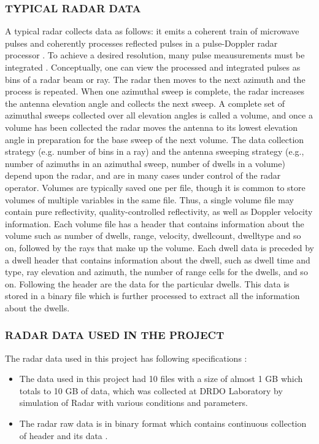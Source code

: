 \documentclass[12pt]{article} %
\begin{document}
\subsubsection{TYPICAL RADAR DATA}
A typical radar collects data as follows: it emits a coherent train of microwave pulses and coherently processes reflected pulses in a pulse-Doppler radar processor . To achieve a desired resolution, many pulse meausurements must be integrated . Conceptually, one can view the processed and integrated pulses as bins of a radar beam or ray. The radar then moves to the next azimuth and the process is repeated. When one azimuthal sweep is complete, the radar increases the antenna elevation angle and collects the next sweep. A complete set of azimuthal sweeps collected over all elevation angles is called a volume, and once a volume has been collected the radar moves the antenna to its lowest elevation angle in preparation for the base sweep of the next volume. The data collection strategy (e.g. number of bins in a ray) and the antenna sweeping strategy (e.g., number of azimuths in an azimuthal sweep, number of dwells in a volume) depend upon the radar, and are in many cases under control of the radar operator.  Volumes are typically saved one per file, though it is common to store volumes of multiple variables in the same file. Thus, a single volume file may contain pure reflectivity, quality-controlled reflectivity, as well as Doppler velocity information. Each volume file has a header that contains information about the volume such as  number of dwells, range, velocity, dwellcount, dwelltype and so on, followed by the rays that make up the volume. Each dwell data is preceded by a dwell header that contains information about the dwell, such as dwell time and type, ray elevation and azimuth, the number of range cells for the dwells, and so on. Following the header are the data for the particular dwells. This data is stored in a binary file which is further processed to extract all the information about the dwells.

\subsubsection{RADAR DATA USED IN THE PROJECT }
\noindent The radar data used in this project has following specifications :
\begin{itemize}
\item The data used in this project had 10 files with a size of almost 1 GB which totals to 10 GB of data, which was collected at DRDO Laboratory by simulation of Radar with various conditions and parameters.
 \item The radar raw data is in binary format which contains continuous collection of  header and its data .
 \end{itemize}
\end{document}
